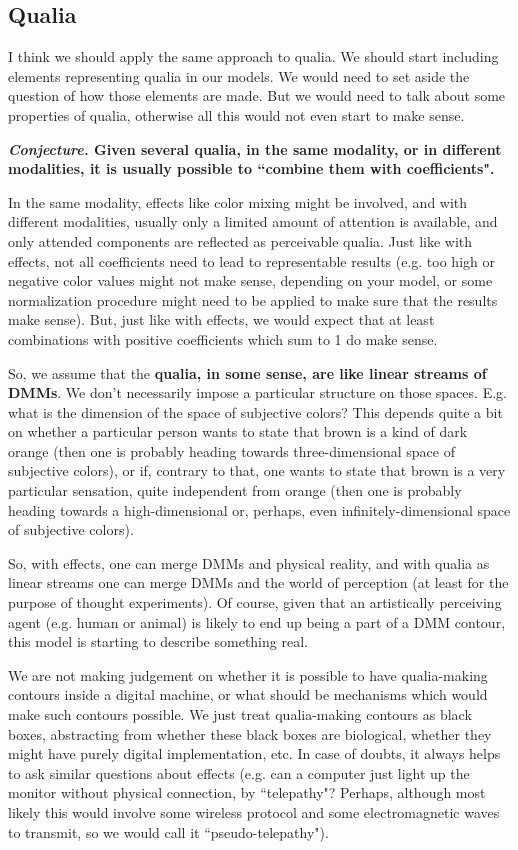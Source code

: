 \documentclass{article}
\begin{document}
\subsection{Qualia}

I think we should apply the same approach to qualia. We should start including elements representing
qualia in our models. We would need to set aside the question of how those elements are made.
But we would need to talk about some properties of qualia, otherwise all this would not even start
to make sense.

{\bf {\em Conjecture.} Given several qualia, in the same modality, or in different modalities, it is usually
possible to ``combine them with coefficients".}

In the same modality, effects like color mixing might be involved, and with different modalities, usually
only a limited amount of attention is available, and only attended components are reflected as 
perceivable qualia. Just like with effects, not all coefficients need to lead to representable results
(e.g. too high or negative color values might not make sense, depending on your model,
or some normalization procedure might need to be applied to make sure that the results
make sense). But, just like with effects, we would expect that at least combinations with
positive coefficients which sum to 1 do make sense.

So, we assume that the {\bf qualia, in some sense, are like linear streams of DMMs}. We don't necessarily
impose a particular structure on those spaces. E.g. what is the dimension of the space of subjective
colors? This depends quite a bit on whether a particular person wants to state that brown is
a kind of dark orange (then one is probably heading towards three-dimensional space of
subjective colors), or if, contrary to that, one wants to state that brown is a very particular sensation,
quite independent from orange (then one is probably heading towards a high-dimensional or,
perhaps, even infinitely-dimensional space of subjective colors).

So, with effects, one can merge DMMs and physical reality, and with qualia as linear streams
one can merge DMMs and the world of perception (at least for the purpose of thought
experiments). Of course, given that an artistically perceiving agent (e.g. human or animal) is likely to end up
being a part of a DMM contour, this model is starting to describe something real.

We are not making judgement on whether it is possible to have qualia-making contours
inside a digital machine, or what should be mechanisms which would make such contours possible.
We just treat qualia-making contours as black boxes, abstracting from whether these black boxes
are biological, whether they might have purely digital implementation, etc. In case of doubts,
it always helps to ask similar questions about effects (e.g. can a computer just light up the monitor
without physical connection, by ``telepathy"? Perhaps, although most likely this would involve some
wireless protocol and some electromagnetic waves to transmit, so we would call it ``pseudo-telepathy").
\end{document}
